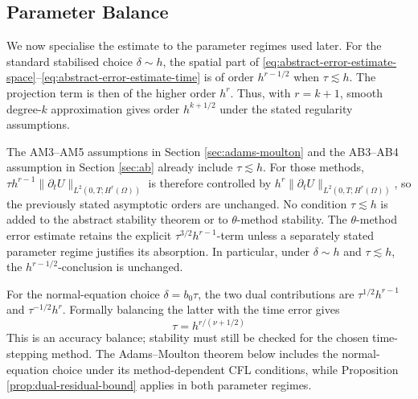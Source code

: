\documentclass[11pt]{article}
\begin{document}

\subsection{Parameter Balance}
\label{subsec:parameter-balance}
We now specialise the estimate to the parameter regimes used later.
For the standard stabilised choice \(\delta\sim h\), the spatial part of
\eqref{eq:abstract-error-estimate-space}--\eqref{eq:abstract-error-estimate-time}
is of order \(h^{r-1/2}\) when \(\tau\lesssim h\). The projection term is
then of the higher order \(h^r\). Thus, with \(r=k+1\), smooth degree-\(k\)
approximation gives order \(h^{k+1/2}\) under the stated regularity
assumptions.

The AM3--AM5 assumptions in Section \ref{sec:adams-moulton} and the
AB3--AB4 assumption in Section \ref{sec:ab} already include
\(\tau\lesssim h\). For those methods,
\(\tau h^{r-1}\|\partial_tU\|_{L^2(0,T;H^r(\Omega))}\) is therefore
controlled by
\(h^r\|\partial_tU\|_{L^2(0,T;H^r(\Omega))}\), so the previously stated
asymptotic orders are unchanged. No condition \(\tau\lesssim h\) is added
to the abstract stability theorem or to \(\theta\)-method stability. The
\(\theta\)-method error estimate retains the explicit
\(\tau^{3/2}h^{r-1}\)-term unless a separately stated parameter regime
justifies its absorption. In particular, under
\(\delta\sim h\) and \(\tau\lesssim h\), the
\(h^{r-1/2}\)-conclusion is unchanged.

For the normal-equation choice \(\delta=b_0\tau\), the two dual contributions
are \(\tau^{1/2}h^{r-1}\) and \(\tau^{-1/2}h^r\). Formally balancing the latter
with the time error gives
\begin{equation}
\tau=h^{r/(\nu+1/2)} \label{eq:normal-equation-parameter-balance}
\end{equation}
This is an accuracy balance; stability must still be checked for the chosen
time-stepping method. The Adams--Moulton theorem below includes the
normal-equation choice under its method-dependent CFL conditions, while
Proposition \ref{prop:dual-residual-bound} applies in both parameter regimes.

\end{document}
